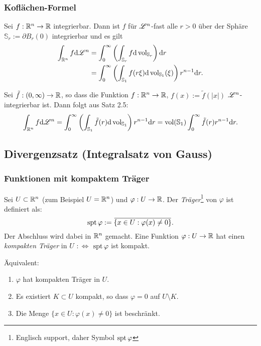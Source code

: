 \subsubsection{Koflächen-Formel}
\begin{thm}
 Sei $f: \mathbb{R}^n \to \mathbb{R}$ integrierbar. Dann ist $f$ für $\mathscr{L}^n$-fast alle $r > 0$ über der Sphäre $\mathbb{S}_r := \partial B_r(0)$ integrierbar und es gilt
 \[ \begin{aligned}
     \int_{\mathbb{R}^n} f \mathrm{d} \mathscr{L}^n
     &= \int_0^\infty \left( \int_{\mathbb{S}_r} f \mathrm{d} \operatorname{vol}_{\mathbb{S}_r} \right) \mathrm{d} r \\
     &= \int_0^\infty \left( \int_{\mathbb{S}_1} f(r \xi) \mathrm{d} \operatorname{vol}_{\mathbb{S}_1}(\xi) \right) r^{n-1} \mathrm{d} r.
    \end{aligned} \]
\end{thm}

\begin{exmp}
 Sei $\tilde{f}:(0,\infty) \to \mathbb{R}$, so dass die Funktion $f: \mathbb{R}^n \to \mathbb{R}$, $f(x) := \tilde{f}(|x|)$ $\mathscr{L}^n$-integrierbar ist. Dann folgt aus Satz 2.5:
 \[ \int_{\mathbb{R}^n} f \mathrm{d} \mathscr{L}^n = \int_0^\infty \left( \int_{\mathbb{S}_1} \tilde{f}(r) \mathrm{d} \operatorname{vol}_{\mathbb{S}_1} \right) r^{n-1} \mathrm{d} r = \operatorname{vol}( \mathbb{S}_1 ) \int_0^\infty \tilde{f}(r) r^{n-1} \mathrm{d} r. \]
\end{exmp}

\subsection{Divergenzsatz (Integralsatz von Gauss)}
\subsubsection{Funktionen mit kompaktem Träger}
Sei $U \subset \mathbb{R}^n$ (zum Beispiel $U = \mathbb{R}^n$) und $\varphi: U \to \mathbb{R}$. Der \emph{Träger}\footnote{Englisch support, daher Symbol $\mathrm{spt}\, \varphi$} von $\varphi$ ist definiert als:
\[ \spt \varphi := \obar{\{ x \in U : \varphi(x) \ne 0 \}}. \]
Der Abschluss wird dabei in $\mathbb{R}^n$ gemacht. Eine Funktion $\varphi: U \to \mathbb{R}$ hat einen \emph{kompakten Träger} in $U$ $:\Leftrightarrow$ $\mathrm{spt}\, \varphi$ ist kompakt.

\begin{rmrk}
 Äquivalent:
 \begin{enumerate}
  \item $\varphi$ hat kompakten Träger in $U$.
  \item Es existiert $K \subset U$ kompakt, so dass $\varphi = 0$ auf $U \setminus K$.
  \item Die Menge $\{x \in U : \varphi(x) \ne 0 \}$ ist beschränkt.
 \end{enumerate}
\end{rmrk}
 
